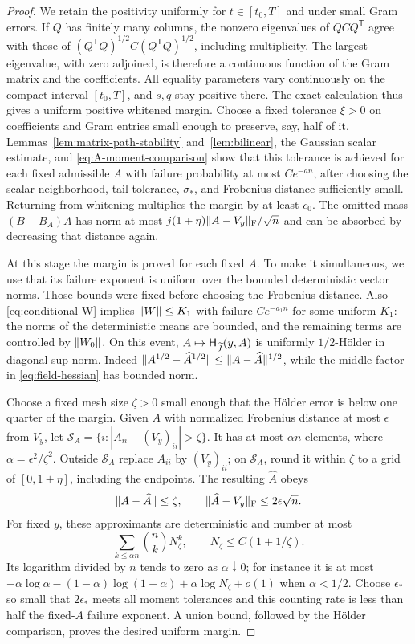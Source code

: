\begin{proof}
We retain the positivity uniformly for $t\in[t_0,T]$ and under
small Gram errors. If $Q$ has finitely many columns, the nonzero
eigenvalues of
$QCQ^{\mathsf T}$ agree with those of
$(Q^{\mathsf T}Q)^{1/2}C(Q^{\mathsf T}Q)^{1/2}$, including
multiplicity.  The largest eigenvalue, with zero adjoined, is therefore
a continuous function of the Gram matrix and the coefficients.
All equality parameters vary continuously on the compact interval
$[t_0,T]$, and $s,q$ stay positive there.  The exact calculation thus
gives a uniform positive whitened margin.  Choose a fixed tolerance
$\xi>0$ on coefficients and Gram entries small enough to preserve,
say, half of it.  Lemmas~\ref{lem:matrix-path-stability}
and~\ref{lem:bilinear}, the Gaussian scalar estimate, and
\eqref{eq:A-moment-comparison} show that this tolerance is achieved
for each fixed admissible $A$ with failure probability at most
$Ce^{-a n}$, after choosing the scalar neighborhood, tail tolerance,
$\sigma_*$, and Frobenius distance sufficiently small.  Returning
from whitening multiplies the margin by at least $c_0$.
The omitted mass $(B-B_A)A$ has norm at most
$j(1+\eta)\lVert A-V_y\rVert_{\mathrm F}/\sqrt n$ and can be absorbed by
decreasing that distance again.

At this stage the margin is proved for each fixed $A$. To make it
simultaneous, we use that its failure exponent is uniform over the
bounded deterministic vector norms. Those bounds were fixed before
choosing the Frobenius distance.  Also \eqref{eq:conditional-W} implies
$\lVert W\rVert\le K_1$ with failure $Ce^{-a_1n}$ for some uniform $K_1$:
the norms of the deterministic means are bounded, and the remaining
terms are controlled by $\lVert W_0\rVert$.
On this event, $A\mapsto\mathsf H_{\widetilde J}(y,A)$ is uniformly
$1/2$-H\"older in diagonal sup norm.  Indeed
$\lVert A^{1/2}-\widehat A^{1/2}\rVert\le
\lVert A-\widehat A\rVert^{1/2}$, while the middle factor in
\eqref{eq:field-hessian} has bounded norm.

Choose a fixed mesh size $\zeta>0$ small enough that the H\"older
error is below one quarter of the margin.  Given $A$ with normalized
Frobenius distance at most $\epsilon$ from $V_y$, let
$\mathcal S_A=\{i:|A_{ii}-(V_y)_{ii}|>\zeta\}$.  It has at most
$\alpha n$ elements, where $\alpha=\epsilon^2/\zeta^2$.
Outside $\mathcal S_A$ replace $A_{ii}$ by $(V_y)_{ii}$; on $\mathcal S_A$, round it
within $\zeta$ to a grid of $[0,1+\eta]$, including the endpoints.
The resulting $\widehat A$ obeys
\[
 \lVert A-\widehat A\rVert\le\zeta,\qquad
 \lVert \widehat A-V_y\rVert_{\mathrm F}\le2\epsilon\sqrt n.
\]
For fixed $y$, these approximants are deterministic and number at
most
\[
 \sum_{k\le\alpha n}\binom nk N_\zeta^k,
 \qquad N_\zeta\le C(1+1/\zeta).
\]
Its logarithm divided by $n$ tends to zero as $\alpha\downarrow0$;
for instance it is at most
$-\alpha\log\alpha-(1-\alpha)\log(1-\alpha)
 +\alpha\log N_\zeta+o(1)$ when $\alpha<1/2$.
Choose $\epsilon_*$ so small that $2\epsilon_*$ meets all moment
tolerances and this counting rate is less than half the fixed-$A$
failure exponent.  A union bound, followed by the H\"older comparison,
proves the desired uniform margin.


\end{proof}
